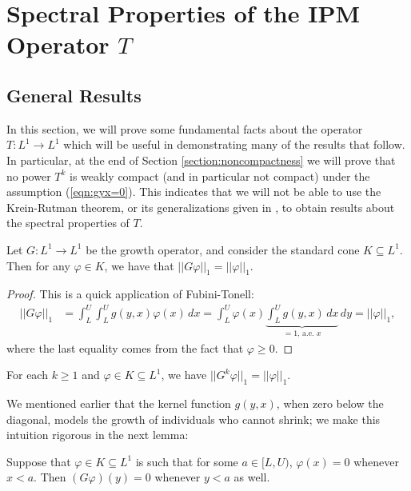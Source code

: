 \chapter{Spectral Properties of the IPM Operator $T$}

\section{General Results} \label{section:general}

In this section, we will prove some fundamental facts about the operator $T:L^1 \to L^1$ which will be useful in demonstrating many of the results that follow. In particular, at the end of Section \ref{section:noncompactness} we will prove that no power $T^k$ is weakly compact (and in particular not compact) under the assumption (\ref{eqn:gyx=0}). This indicates that we will not be able to use the Krein-Rutman theorem, or its generalizations given in \cite{Kras1989}, to obtain results about the spectral properties of $T$.

\begin{lemma} \label{th:norm=1}
	Let $G:L^1 \to L^1$ be the growth operator, and consider the standard cone $K \subseteq L^1$. Then for any $\varphi \in K$, we have that $||G \varphi||_1 = ||\varphi||_1$.
\end{lemma}

\begin{proof}
	This is a quick application of Fubini-Tonell:
	\begin{align*}
		||G\varphi||_1 &= \int_L^U \int_L^U g(y,x) \varphi(x) \, dx = \int_L^U \varphi(x) \underbrace{\int_L^U g(y,x) \, dx}_{=1, \, \text{a.e. } x} \, dy = ||\varphi||_1,
	\end{align*}
	where the last equality comes from the fact that $\varphi \geq 0$.
\end{proof}

\begin{corollary} \label{th:corollarytonorm=1}
	For each $k \geq 1$ and $\varphi \in K \subseteq L^1$, we have $||G^k \varphi||_1 = ||\varphi||_1$.
\end{corollary}

We mentioned earlier that the kernel function $g(y,x)$, when zero below the diagonal, models the growth of individuals who cannot shrink; we make this intuition rigorous in the next lemma:

\begin{lemma} \label{th:giszero}
	Suppose that $\varphi \in K \subseteq L^1$ is such that for some $a \in [L,U)$, $\varphi(x) = 0$ whenever $x < a$. Then $(G\varphi)(y) =0$ whenever $y < a$ as well.
\end{lemma}

